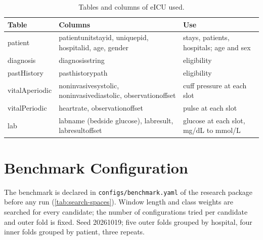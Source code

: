 \documentclass[11pt,a4paper,oneside]{report}
\begin{document}
\begin{table}[htbp]
\centering\footnotesize
\caption{Tables and columns of eICU used.}\label{tab:dict-eicu}
\begin{tabularx}{\textwidth}{@{}>{\ttfamily\raggedright\arraybackslash}p{2.6cm} >{\ttfamily\raggedright\arraybackslash}X >{\raggedright\arraybackslash}p{4.6cm}@{}}
\toprule
\normalfont\textbf{Table} & \normalfont\textbf{Columns} & \textbf{Use} \\
\midrule
patient & patientunitstayid, uniquepid, hospitalid, age, gender & stays, patients, hospitals; age and sex \\
diagnosis & diagnosisstring & eligibility \\
pastHistory & pasthistorypath & eligibility \\
vitalAperiodic & noninvasivesystolic, noninvasivediastolic, observationoffset & cuff pressure at each slot \\
vitalPeriodic & heartrate, observationoffset & pulse at each slot \\
lab & labname (bedside glucose), labresult, labresultoffset & glucose at each slot, mg/dL to mmol/L \\
\bottomrule
\end{tabularx}
\end{table}

\chapter{Benchmark Configuration}\label{app:config}

The benchmark is declared in \texttt{configs/benchmark.yaml} of the research package before any run (\cref{tab:search-spaces}). Window length and class weights are searched for every candidate; the number of configurations tried per candidate and outer fold is fixed. Seed 20261019; five outer folds grouped by hospital, four inner folds grouped by patient, three repeats.
\end{document}
